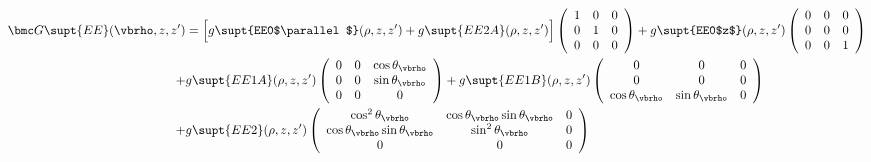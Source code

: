 \documentclass[letterpaper]{article}
\begin{document}
\begin{align*}
 \bmc G\supt{EE}(\vbrho, z, z^\prime)
&=\Big[  g\supt{EE0$\parallel$}(\rho,z,z^\prime)
         +g\supt{EE2A}(\rho,z,z^\prime)
  \Big]
  \left(\begin{array}{ccc}
  1 & 0 & 0 \\ 
  0 & 1 & 0 \\ 
  0 & 0 & 0 \\ 
  \end{array}\right)
  +g\supt{EE0$z$}(\rho,z,z^\prime)
  \left(\begin{array}{ccc}
  0 & 0 & 0 \\ 
  0 & 0 & 0 \\ 
  0 & 0 & 1 \\ 
  \end{array}\right)
\\
 + &g\supt{EE1A}(\rho,z,z^\prime)
   \left(\begin{array}{ccc}
    0                     & 0                   & \cos\theta_{\vbrho} \\
    0                     & 0                   & \sin\theta_{\vbrho} \\
    0                     & 0                   & 0 
   \end{array}\right)
 + g\supt{EE1B}(\rho,z,z^\prime)
   \left(\begin{array}{ccc}
    0                     & 0                    & 0 \\
    0                     & 0                    & 0 \\
    \cos\theta_{\vbrho}   & \sin\theta_{\vbrho}  & 0
   \end{array}\right)
\\
  +&g\supt{EE2}(\rho,z,z^\prime)
   \left(\begin{array}{ccc}
    \cos^2\theta_{\vbrho}  & \cos\theta_{\vbrho} \sin\theta_{\vbrho} & 0 \\
    \cos\theta_{\vbrho} \sin\theta_{\vbrho} & \sin^2\theta_{\vbrho}  & 0 \\
    0                     & 0                    & 0
   \end{array}\right)
\end{align*}
\end{document}
